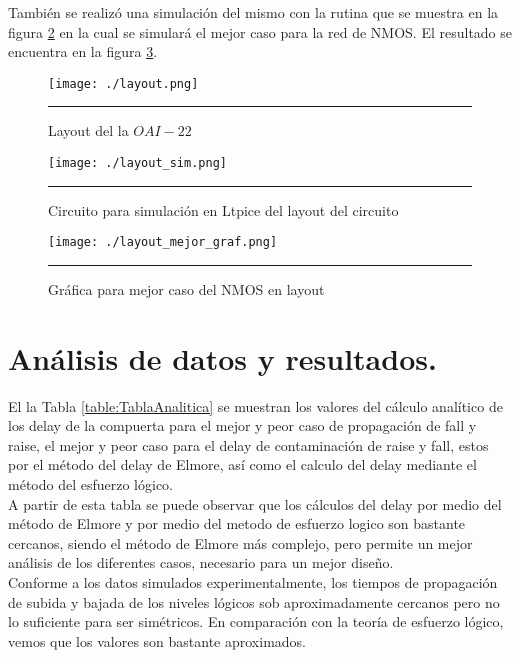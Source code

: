 \documentclass[12pt,a4paper]{article} %
\begin{document}
También se realizó una simulación del mismo con la rutina que se muestra en la figura \ref{fig:layout_sim} en la cual se simulará el mejor caso para la red de NMOS. El resultado se encuentra en la figura \ref{fig:layout_graf}.

\begin{figure}[htbp]
\begin{center}
    \texttt{[image: ./layout.png]}
    \rule{35em}{0.5pt}
  \caption[Captura]{Layout del la $OAI-22$}
  \label{fig:layout}
  \end{center}
\end{figure}

\begin{figure}[htbp]
\begin{center}
    \texttt{[image: ./layout\_sim.png]}
    \rule{35em}{0.5pt}
  \caption[Captura]{Circuito para simulación en Ltpice del layout del circuito}
  \label{fig:layout_sim}
  \end{center}
\end{figure}

\begin{figure}[htbp]
\begin{center}
    \texttt{[image: ./layout\_mejor\_graf.png]}
    \rule{35em}{0.5pt}
  \caption[Captura]{Gráfica para mejor caso del NMOS en layout}
  \label{fig:layout_graf}
  \end{center}
\end{figure}

\section{Análisis de datos y resultados.}

El la Tabla \ref{table:TablaAnalitica} se muestran los valores del cálculo analítico de los delay de la compuerta para el mejor y peor caso de propagación de fall y raise, el mejor y peor caso para el delay de contaminación de raise y fall, estos por el método del delay de Elmore, así como el calculo del delay mediante el método del esfuerzo lógico.\\

A partir de esta tabla se puede observar que los cálculos del delay por medio del método de Elmore y por medio del metodo de esfuerzo logico son bastante cercanos, siendo el método de Elmore más complejo, pero permite un mejor análisis de los diferentes casos, necesario para un mejor diseño.\\

Conforme a los datos simulados experimentalmente, los tiempos de propagación de subida y bajada de los niveles lógicos sob aproximadamente cercanos pero no lo suficiente para ser simétricos. En comparación con la teoría de esfuerzo lógico, vemos que los valores son bastante aproximados.\\
\end{document}

